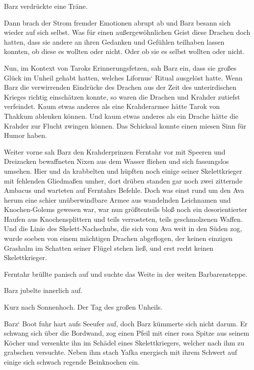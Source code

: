 Barz verdrückte eine Träne.

Dann brach der Strom fremder Emotionen abrupt ab und Barz besann sich wieder auf sich selbst. Was für einen außergewöhnlichen Geist diese Drachen doch hatten, dass sie andere an ihren Gedanken und Gefühlen teilhaben lassen konnten, ob diese es wollten oder nicht. Oder ob sie es selbst wollten oder nicht.

Nun, im Kontext von Taroks Erinnerungsfetzen, sah Barz ein, dass sie großes Glück im Unheil gehabt hatten, welches Lifornus‘ Ritual ausgelöst hatte. Wenn Barz die verwirrenden Eindrücke des Drachen aus der Zeit des unterirdischen Krieges richtig einschätzen konnte, so waren die Drachen und Krahder zutiefst verfeindet. Kaum etwas anderes als eine Krahderarmee hätte Tarok von Thakkum ablenken können. Und kaum etwas anderes als ein Drache hätte die Krahder zur Flucht zwingen können. Das Schicksal konnte einen miesen Sinn für Humor haben.

Weiter vorne sah Barz den Krahderprinzen Ferntahr vor mit Speeren und Dreizacken bewaffneten Nixen aus dem Wasser fliehen und sich fassungslos umsehen. Hier und da krabbelten und hüpften noch einige seiner Skelettkrieger mit fehlenden Gliedmaßen umher, dort drüben standen gar noch zwei zitternde Ambacus und warteten auf Ferntahrs Befehle. Doch was einst rund um den Ava herum eine schier unüberwindbare Armee aus wandelnden Leichnamen und Knochen-Golems gewesen war, war nun größtenteils bloß noch ein desorientierter Haufen aus Knochensplittern und teils verrosteten, teils geschmolzenen Waffen. Und die Linie des Skelett-Nachschubs, die sich vom Ava weit in den Süden zog, wurde soeben von einem mächtigen Drachen abgeflogen, der keinen einzigen Grashalm im Schatten seiner Flügel stehen ließ, und erst recht keinen Skelettkrieger.

Ferntahr brüllte panisch auf und suchte das Weite in der weiten Barbarensteppe.

Barz jubelte innerlich auf.\bigskip







Kurz nach Sonnenhoch. Der Tag des großen Unheils.\bigskip



Barz‘ Boot fuhr hart aufs Seeufer auf, doch Barz kümmerte sich nicht darum. Er schwang sich über die Bordwand, zog einen Pfeil mit einer rosa Spitze aus seinem Köcher und versenkte ihn im Schädel eines Skelettkriegers, welcher nach ihm zu grabschen versuchte. Neben ihm stach Yafka energisch mit ihrem Schwert auf einige sich schwach regende Beinknochen ein.

